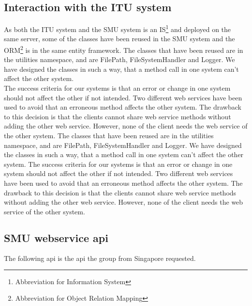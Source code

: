 \documentclass[a4paper,11pt,report]{article}
\begin{document}
\subsection{Interaction with the ITU system}
As both the ITU system and the SMU system is an IS\footnote[2]{Abbreviation for Information System} and deployed on the same server,  some of the classes have been reused in the SMU system and the ORM\footnote[3]{Abbreviation for Object Relation Mapping} is in the same entity framework.
The classes that have been reused are in the utilities namespace, and are FilePath, FileSystemHandler and Logger. We have designed the classes in such a way, that a method call in one system can't affect the other system. \\
The success criteria for our systems is that an error or change in one system should not affect the other if not intended. Two different web services have been used to avoid that an erroneous method affects the other system.
The drawback to this decision is that the clients cannot share web service methods without adding the other web service. However, none of the client needs the web service of the other system. 
The classes that have been reused are in the utilities namespace, and are FilePath, FileSystemHandler and Logger. We have designed the classes in such a way, that a method call in one system can't affect the other system.
The success criteria for our systems is that an error or change in one system should not affect the other if not intended. Two different web services have been used to avoid that an erroneous method affects the other system.
The drawback to this decision is that the clients cannot share web service methods without adding the other web service. However, none of the client needs the web service of the other system. 

\subsection{SMU webservice api}

The following api is the api the group from Singapore requested. 
\end{document}
